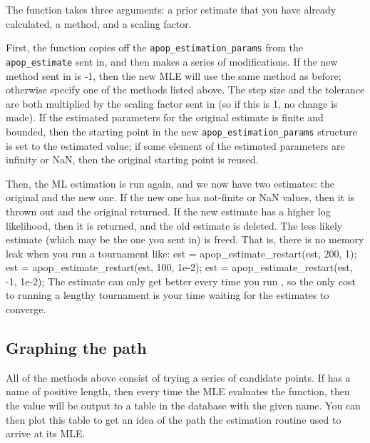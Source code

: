 The function takes three arguments: a prior estimate that you have
already calculated, a method, and a scaling factor. 

First, the function copies off the {\tt apop\_\-estimation\_\-params}
from the {\tt apop\_\-estimate} sent in, and then makes a series of
modifications.  If the new method sent in is -1, then the new MLE will
use the same method as before; otherwise specify one of the methods
listed above. The step size and the tolerance are both multiplied by the
scaling factor sent in (so if this is 1, no change is made). If the
estimated parameters for the original estimate is finite and bounded, then 
the starting point in the new {\tt apop\_\-estimation\_\-params}
structure is set to the estimated value; if some element of the
estimated parameters are infinity or NaN, then the original starting
point is reused.

Then, the ML estimation is run again, and we now have two estimates: the
original and the new one. If the new one has not-finite or NaN values,
then it is thrown out and the original returned. If the new estimate 
has a higher log likelihood, then it is returned, and the old estimate
is deleted.  The less likely estimate (which may be the one you sent in) is freed. That is,
there is no memory leak when you run a tournament like:
est = apop_estimate_restart(est, 200, 1);
est = apop_estimate_restart(est, 100, 1e-2);
est = apop_estimate_restart(est, -1, 1e-2);
The estimate can only get better every time you run
, so the only cost to running a lengthy
tournament is your time waiting for the estimates to converge.

\subsection{Graphing the path} All of the methods above consist of
trying a series of candidate points. 
If 
has a name of positive
length, then every time the MLE evaluates the function, then the value
will be output to a table in the database with the given name. You can
then plot this table to get an idea of the path the estimation routine
used to arrive at its MLE.

